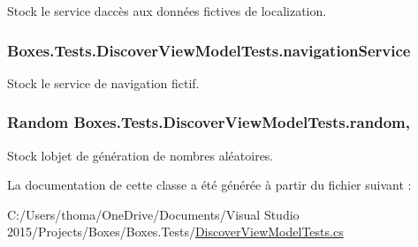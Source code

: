 Stock le service d\textquotesingle{}accès aux données fictives de localization. 

\subsubsection[{\texorpdfstring{navigation\+Service}{navigationService}}]{ Boxes.\+Tests.\+Discover\+View\+Model\+Tests.\+navigation\+Service\hspace{0.3cm}{\ttfamily [private]}}\hypertarget{class_boxes_1_1_tests_1_1_discover_view_model_tests_a6deba16334eacb2749678716199ada87}{}\label{class_boxes_1_1_tests_1_1_discover_view_model_tests_a6deba16334eacb2749678716199ada87}


Stock le service de navigation fictif. 

\subsubsection[{\texorpdfstring{random}{random}}]{\setlength{\rightskip}{0pt plus 5cm}Random Boxes.\+Tests.\+Discover\+View\+Model\+Tests.\+random\hspace{0.3cm}{\ttfamily [static]}, {\ttfamily [private]}}\hypertarget{class_boxes_1_1_tests_1_1_discover_view_model_tests_aa69a807ac10e1bcb4367c75d4e4641c8}{}\label{class_boxes_1_1_tests_1_1_discover_view_model_tests_aa69a807ac10e1bcb4367c75d4e4641c8}


Stock l\textquotesingle{}objet de génération de nombres aléatoires. 



La documentation de cette classe a été générée à partir du fichier suivant \+:\begin{DoxyCompactItemize}
\item 
C\+:/\+Users/thoma/\+One\+Drive/\+Documents/\+Visual Studio 2015/\+Projects/\+Boxes/\+Boxes.\+Tests/\hyperlink{_discover_view_model_tests_8cs}{Discover\+View\+Model\+Tests.\+cs}\end{DoxyCompactItemize}
